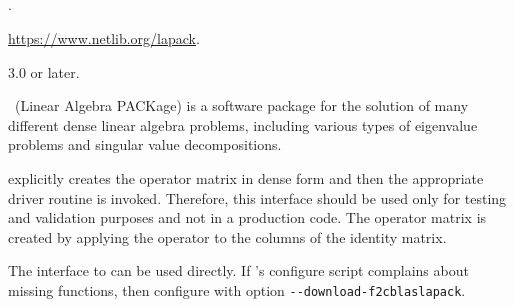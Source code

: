 \subsection*{\underline{\lapack}}
\begin{description}
\setlength{\itemsep}{0pt}
\item[References.]\citep{Anderson:1999:LUG}.
\item[Website.] \url{https://www.netlib.org/lapack}.
\item[Version.] 3.0 or later.
\item[Summary.] \lapack\ (Linear Algebra PACKage) is a software package for the solution of many different dense linear algebra problems, including various types of eigenvalue problems and singular value decompositions.

\slepc explicitly creates the operator matrix in dense form and then the appropriate \lapack driver routine is invoked. Therefore, this interface should be used only for testing and validation purposes and not in a production code. The operator matrix is created by applying the operator to the columns of the identity matrix.

\item[Installation.]
The \slepc interface to \lapack can be used directly. If \slepc's configure script complains about missing \lapack functions, then configure \petsc with option \texttt{-{}-download-f2cblaslapack}.
\end{description}

